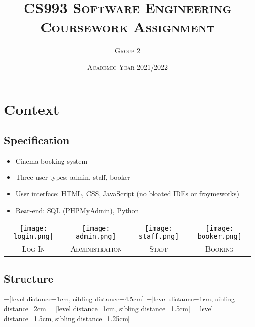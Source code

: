 \documentclass[10pt, english, aspectratio=169]{beamer}
\begin{document}

	\title{\textsc{CS993 Software Engineering\\ Coursework Assignment}}
	\author{\textsc{Group 2}}
	\date{\textsc{Academic Year 2021/2022}}
        \maketitle

\newpage


\section{Context}

	\subsection{Specification}

	\begin{itemize}
	\setlength\itemsep{0cm}
		\item Cinema booking system
		\item Three user types: admin, staff, booker 
		\item User interface: HTML, CSS, JavaScript (no bloated IDEs or froymeworks)
		\item Rear-end: SQL (PHPMyAdmin), Python
	\end{itemize}
	
	\begin{center}
	\begin{tabular}{cccc}
		\texttt{[image: login.png]} & 
		\texttt{[image: admin.png]} & 
		\texttt{[image: staff.png]} & 
		\texttt{[image: booker.png]}\\
		\textsc{Log-In} & \textsc{Administration} & \textsc{Staff} & \textsc{Booking}\\
	\end{tabular}
	\end{center}

\newpage

	\subsection{Structure}

	=[level distance=1cm, sibling distance=4.5cm]
        =[level distance=1cm, sibling distance=2cm]
        =[level distance=1cm, sibling distance=1.5cm]
        =[level distance=1.5cm, sibling distance=1.25cm]
\end{document}
